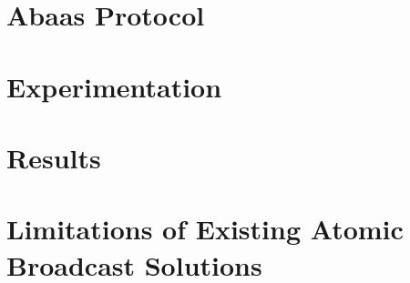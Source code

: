 \section{Abaas Protocol}

\section{Experimentation}

\section{Results}

\section{Limitations of Existing Atomic Broadcast Solutions}
